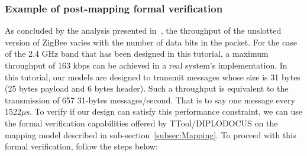 \documentclass{llncs}
\begin{document}
\subsubsection{Example of post-mapping formal verification}
As concluded by the analysis presented in~\cite{Latre06}, the throughput of the
unslotted version of ZigBee varies with the number of data bits in the packet.
For the case of the 2.4 GHz band that has been designed in this tutorial, a
maximum throughput of 163 kbps can be achieved in a real system's
implementation. In this tutorial, our models are designed to transmit messages
whose size is 31 bytes (25 bytes payload and 6 bytes header).
Such a throughput is equivalent to the transmission of 657 31-bytes
messages/second. That is to say one message every 1522$\mu\text{s}$. To verify
if our design can satisfy this performance constraint, we can use the formal
verification capabilities offered by TTool/DIPLODOCUS on the mapping model
described in sub-section~\ref{subsec:Mapping}. To proceed with this formal
verification, follow the steps below:
\end{document}
